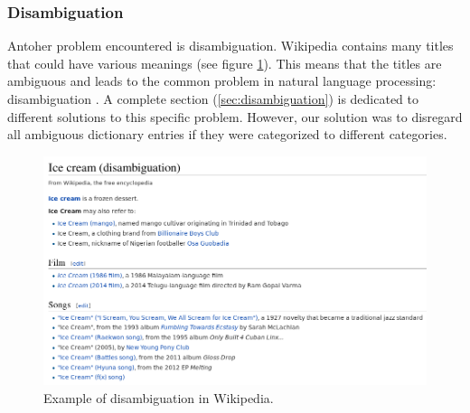 \subsubsection{Disambiguation}
Antoher problem encountered is disambiguation. Wikipedia contains many titles that could have various meanings (see figure \ref{fig:disambiguation_example}). This means that the titles are ambiguous and leads to the common problem in natural language processing: disambiguation \cite{wiki:disambiguation}. A complete section (\ref{sec:disambiguation}) is dedicated to different solutions to this specific problem. However, our solution was to disregard all ambiguous dictionary entries if they were categorized to different categories.

\begin{figure}[h]
\centering
\includegraphics[width=\textwidth]{Chapters/Introduction/Ice_cream_disambiguation}
\caption{Example of disambiguation in Wikipedia.} %
\label{fig:disambiguation_example}
\end{figure}